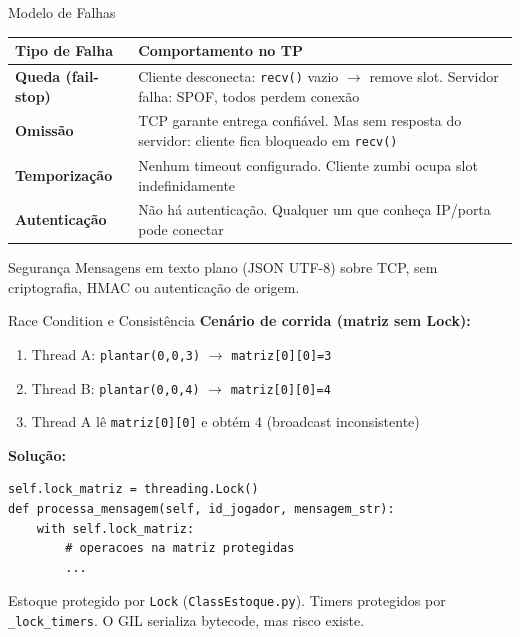 \documentclass[aspectratio=169]{beamer}
\begin{document}
\begin{frame}{Modelo de Falhas}
  \footnotesize
  \begin{tabular}{>{\raggedright\arraybackslash}p{3.5cm}>{\raggedright\arraybackslash}p{9cm}}
    \toprule
    \textbf{Tipo de Falha} & \textbf{Comportamento no TP} \\
    \midrule
    \textbf{Queda (fail-stop)} & Cliente desconecta: \texttt{recv()} vazio $\rightarrow$ remove slot. Servidor falha: SPOF, todos perdem conex\~ao \\
    \textbf{Omiss\~ao} & TCP garante entrega confi\'avel. Mas sem resposta do servidor: cliente fica bloqueado em \texttt{recv()} \\
    \textbf{Temporiza\c{c}\~ao} & Nenhum timeout configurado. Cliente zumbi ocupa slot indefinidamente \\
    \textbf{Autentica\c{c}\~ao} & N\~ao h\'a autentica\c{c}\~ao. Qualquer um que conhe\c{c}a IP/porta pode conectar \\
    \bottomrule
  \end{tabular}
  \vfill
  \begin{alertblock}{Seguran\c{c}a}
    Mensagens em texto plano (JSON UTF-8) sobre TCP, sem criptografia, HMAC ou autentica\c{c}\~ao de origem.
  \end{alertblock}
\end{frame}

\begin{frame}[fragile]{Race Condition e Consist\^encia}
  \textbf{Cen\'ario de corrida (matriz sem Lock):}
  \begin{enumerate}
    \item Thread A: \texttt{plantar(0,0,3)} $\rightarrow$ \texttt{matriz[0][0]=3}
    \item Thread B: \texttt{plantar(0,0,4)} $\rightarrow$ \texttt{matriz[0][0]=4}
    \item Thread A l\^e \texttt{matriz[0][0]} e obt\'em 4 (broadcast inconsistente)
  \end{enumerate}
  \vfill
  \textbf{Solu\c{c}\~ao:}
\begin{lstlisting}[style=pycode, basicstyle=\ttfamily\footnotesize]
self.lock_matriz = threading.Lock()
def processa_mensagem(self, id_jogador, mensagem_str):
    with self.lock_matriz:
        # operacoes na matriz protegidas
        ...
\end{lstlisting}
  Estoque protegido por \texttt{Lock} (\texttt{ClassEstoque.py}). Timers protegidos por \texttt{\_lock\_timers}. O GIL serializa bytecode, mas risco existe.
\end{frame}
\end{document}

